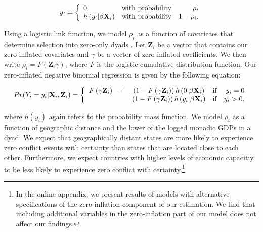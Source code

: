 \documentclass[12pt]{article}
\theoremstyle{hypothesis}
\begin{document}
\[
 y_{i} = \left\{
  \begin{array}{l c r}
   0 & \text{with probability} & \rho_{i} \\
   h\left(y_{i}|\beta\mathbf{X}_{i}\right)      & \text{with probability} & 1 - \rho_{i}.
  \end{array}
\right.
\]

Using a logistic link function, we model $\rho_{i}$ as a function of covariates that determine selection into zero-only dyads \citep{Long:1997}. Let $\mathbf{Z}_{i}$ be a vector that contains our zero-inflated covariates and $\gamma$ be a vector of zero-inflated coefficients.  We then write $\rho_{i} = F\left(\mathbf{Z}_{i}\gamma\right)$, where $F$ is the logistic cumulative distribution function. Our zero-inflated negative binomial regression is given by the following equation:

\[
Pr(Y_{i}=y_{i}|\mathbf{X}_{i},\mathbf{Z}_{i})= \left\{
	\begin{array}{l c c c r}
		F\left(\gamma \mathbf{Z}_{i}\right) &+ & \left(1-F\left(\gamma 						\mathbf{Z}_{i}\right)\right) h\left(0|\beta\mathbf{X}_{i}\right) & \text{if}& y_{i} =0 \\
		& & \left(1-F\left(\gamma \mathbf{Z}_{i}\right)\right)h\left(y_{i}|\beta\mathbf{X}_{i}\right) & 		\text{if}&  y_{i} > 0,
	\end{array}
\right.
\]

\noindent where $h(y_{i})$ again refers to the probability mass function. We model $\rho_{i}$ as a function of geographic distance and the lower of the logged monadic GDPs in a dyad. We expect that geographically distant states are more likely to experience zero conflict events with certainty than states that are located close to each other. Furthermore, we expect countries with higher levels of economic capacitiy to be less likely to experience zero conflict with certainty.\footnote{In the online appendix, we present results of models with alternative specifications of the zero-inflation component of our estimation. We find that including additional variables in the zero-inflation part of our model does not affect our findings.}
\end{document}
